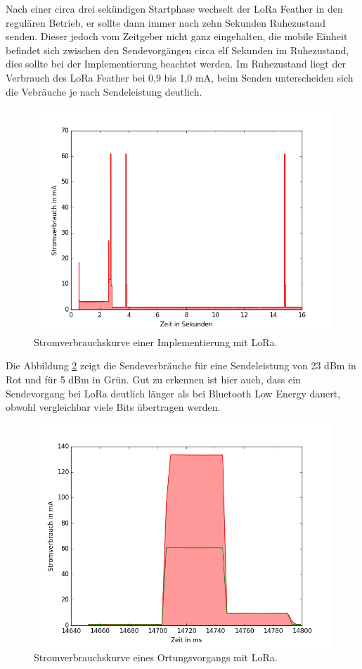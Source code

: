 Nach einer circa drei sekündigen Startphase wechselt der LoRa Feather in den regulären Betrieb, er sollte dann immer nach zehn Sekunden Ruhezustand senden.
Dieser jedoch vom Zeitgeber nicht ganz eingehalten, die mobile Einheit befindet sich zwischen den Sendevorgängen circa elf Sekunden im Ruhezustand, dies sollte bei der Implementierung beachtet werden.
Im Ruhezustand liegt der Verbrauch des LoRa Feather bei 0,9 bis 1,0 mA, beim Senden unterscheiden sich die Vebräuche je nach Sendeleistung deutlich.

\begin{figure}[h!]
  \centering
	\includegraphics[width=\textwidth]{plots/lora5.png}
  \caption{Stromverbrauchskurve einer Implementierung mit LoRa.}
  \label{fig:lora5}
\end{figure}

Die Abbildung \ref{fig:lora235send} zeigt die Sendeverbräuche für eine Sendeleistung von 23 dBm in Rot und für 5 dBm in Grün.
Gut zu erkennen ist hier auch, dass ein Sendevorgang bei LoRa deutlich länger als bei Bluetooth Low Energy dauert, obwohl vergleichbar viele Bits übertragen werden.

\begin{figure}[h!]
  \centering
	\includegraphics[width=\textwidth]{plots/lora235send.png}
  \caption{Stromverbrauchskurve eines Ortungsvorgangs mit LoRa.}
  \label{fig:lora235send}
\end{figure}

